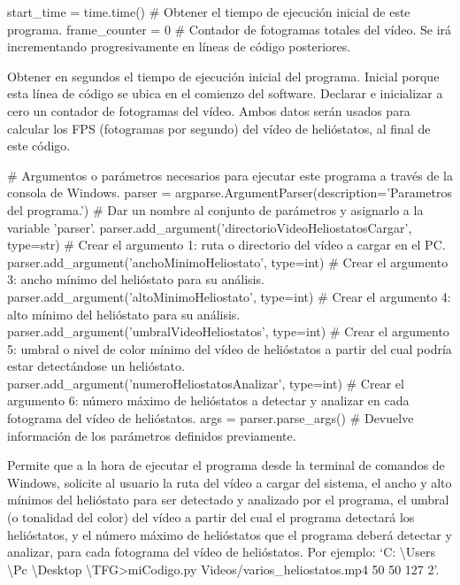 start\_time = time.time() \# Obtener el tiempo de ejecución inicial de este programa.
frame\_counter = 0 \# Contador de fotogramas totales del vídeo. Se irá incrementando progresivamente en líneas de código posteriores.

Obtener en segundos el tiempo de ejecución inicial del programa. Inicial porque esta línea de código se ubica en el comienzo del software. Declarar e inicializar a cero un contador de fotogramas del vídeo. Ambos datos serán usados para calcular los FPS (fotogramas por segundo) del vídeo de helióstatos, al final de este código.


\# Argumentos o parámetros necesarios para ejecutar este programa a través de la consola de Windows.
parser = argparse.ArgumentParser(description='Parametros del programa.') \# Dar un nombre al conjunto de parámetros y asignarlo a la variable 'parser'.
parser.add\_argument('directorioVideoHeliostatosCargar', type=str) \# Crear el argumento 1: ruta o directorio del vídeo a cargar en el PC.
parser.add\_argument('anchoMinimoHeliostato', type=int) \# Crear el argumento 3: ancho mínimo del helióstato para su análisis.
parser.add\_argument('altoMinimoHeliostato', type=int) \# Crear el argumento 4: alto mínimo del helióstato para su análisis.
parser.add\_argument('umbralVideoHeliostatos', type=int) \# Crear el argumento 5: umbral o nivel de color mínimo del vídeo de helióstatos a partir del cual podría estar detectándose un helióstato.
parser.add\_argument('numeroHeliostatosAnalizar', type=int) \# Crear el argumento 6: número máximo de helióstatos a detectar y analizar en cada fotograma del vídeo de helióstatos.
args = parser.parse\_args() \# Devuelve información de los parámetros definidos previamente.

Permite que a la hora de ejecutar el programa desde la terminal de comandos de Windows, solicite al usuario la ruta del vídeo a cargar del sistema, el ancho y alto mínimos del helióstato para ser detectado y analizado por el programa, el umbral (o tonalidad del color) del vídeo a partir del cual el programa detectará los helióstatos, y el número máximo de helióstatos que el programa deberá detectar y analizar, para cada fotograma del vídeo de helióstatos. Por ejemplo: ‘C: \textbackslash Users \textbackslash Pc \textbackslash Desktop \textbackslash TFG>miCodigo.py Videos/varios\_heliostatos.mp4 50 50 127 2’.

